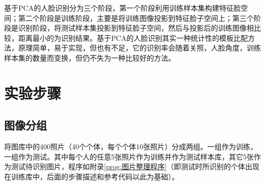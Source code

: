 \documentclass[a4paper]{ctexart}
\begin{document}
基于PCA的人脸识别分为三个阶段，第一个阶段利用训练样本集构建特征脸空间；第二个阶段是训练阶段，主要是将训练图像投影到特征脸子空间上；第三个阶段是识别阶段，将测试样本集投影到特征脸子空间，然后与投影后的训练图像相比较，距离最小的为识别结果。基于PCA的人脸识别其实一种统计性的模板比配方法，原理简单，易于实现，但也有不足，它的识别率会随着关照，人脸角度，训练样本集的数量而变换，但仍不失为一种比较好的方法。


\section{实验步骤}
\subsection{图像分组}\label{sec:图像分组}
将图库中的400照片（40个个体，每个个体10张照片）分成两组。一组作为训练，一组作为测试。其中每个人的任意5张照片作为训练并作为测试样本库，其它5张作为测试待识别图片，程序如附录\ref{prog:图片整理程序}（即测试时所识别的个体出现在训练库中，后面的步骤描述和参考代码以此为基础）。
\end{document}
